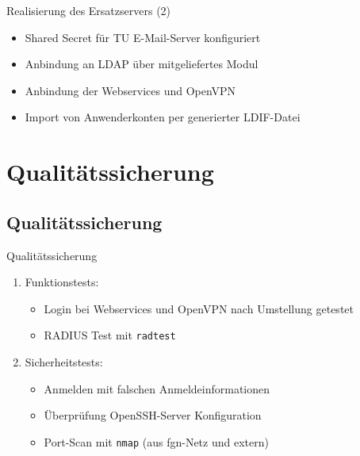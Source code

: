 \documentclass[presentation,svgnames,12pt]{beamer}
\begin{document}
\begin{frame}{Realisierung des Ersatzservers (2)}
\begin{itemize}
	\item Shared Secret für TU E-Mail-Server konfiguriert
	\item Anbindung an LDAP über mitgeliefertes Modul%
	\item Anbindung der Webservices und OpenVPN
	\item Import von Anwenderkonten per generierter LDIF-Datei
\end{itemize}
\end{frame}




\section{Qualitätssicherung}
\subsection{Qualitätssicherung}
\begin{frame}{Qualitätssicherung}
\begin{enumerate}
	\item Funktionstests:
	\vspace{6pt}
	\begin{itemize}
		\item Login bei Webservices und OpenVPN nach Umstellung getestet
		\item RADIUS Test mit \texttt{radtest}%
	\end{itemize}
	\item Sicherheitstests:
	\vspace{6pt}
	\begin{itemize}
		\item Anmelden mit falschen Anmeldeinformationen%
		\item Überprüfung OpenSSH-Server Konfiguration
		\item Port-Scan mit \texttt{nmap} (aus fgn-Netz und extern)
	\end{itemize}
\end{enumerate}
\end{frame}
\end{document}

